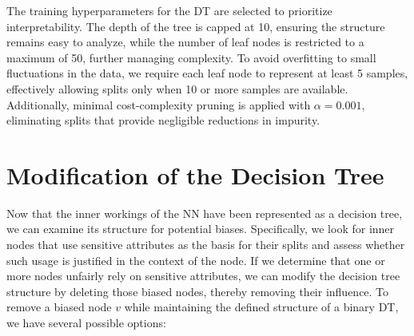 The training hyperparameters for the DT are selected to prioritize interpretability.
The depth of the tree is capped at 10, ensuring the structure remains easy to analyze,
while the number of leaf nodes is restricted to a maximum of 50, further managing complexity.
To avoid overfitting to small fluctuations in the data,
we require each leaf node to represent at least 5 samples,
effectively allowing splits only when 10 or more samples are available.
Additionally, minimal cost-complexity pruning is applied with $\alpha=0.001$,
eliminating splits that provide negligible reductions in impurity.


\section{Modification of the Decision Tree}
Now that the inner workings of the NN have been represented as a decision tree,
we can examine its structure for potential biases.
Specifically, we look for inner nodes that use sensitive attributes as the basis for their splits
and assess whether such usage is justified in the context of the node.
If we determine that one or more nodes unfairly rely on sensitive attributes,
we can modify the decision tree structure by deleting those biased nodes,
thereby removing their influence.
To remove a biased node $v$ while maintaining the defined structure of a binary DT,
we have several possible options:

